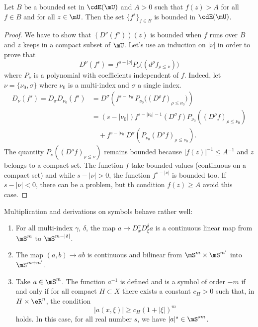 \begin{lemma}   \label{LemHIUsKABh}
Let $B$ be a bounded set in $\cdE(\mU)$ and $A>0$ such that $f(z)>A$ for all $f\in B$ and for all $z\in\mU$. Then the set $\{f^s\}_{f\in B}$ is bounded in $\cdE(\mU)$.
\end{lemma}

\begin{proof}
We have to show that $(D^{\nu}(f^s))(z)$ is bounded when $f$ runs over $B$ and $z$ keeps in a compact subset of $\mU$. Let's use an induction on $|\nu|$ in order to prove that
\[
   D^{\nu}(f^s)=f^{s-|\nu|}P_{\nu}\big(  (d^{\rho}f_{\rho\leq\nu})   \big)
\]
where $P_{\nu}$ is a polynomial with coefficients independent of $f$. Indeed, let $\nu=\{\nu_0,\sigma\}$ where $\nu_0$ is a multi-index and $\sigma$ a single index.
\begin{equation}
\begin{split}
  D_{\nu}(f^s)=D_{\sigma}D_{\nu_0}(f^s)&=D^{\sigma}\left( f^{s-|\nu_0|}P_{\nu_0}\big( (D^{\rho}f)_{\rho\leq\nu_0} \big) \right)\\
              &=(s-|\nu_0|)f^{s-|\nu_0|-1}(D^{\sigma}f)P_{\nu_0}\left( (D^{\rho}f)_{\rho\leq\nu_0} \right)\\
              &\quad    +f^{s-|\nu_0|}D^{\sigma}\left( P_{\nu_0}(D^{\rho}f)_{\rho\leq\nu_0} \right).
\end{split}
\end{equation}
The quantity $P_{\nu}\left( (D^{\rho}f)_{\rho\leq\nu} \right)$ remains bounded because $|f(z)|^{-1}\leq A^{-1}$ and $z$ belongs to a compact set. The function $f$ take bounded values (continuous on a compact set) and while $s-|\nu|>0$, the function $f^{s-|\nu|}$ is bounded too. If $s-|\nu|<0$, there can be a problem, but th condition $f(z)\geq A$ avoid this case.
\end{proof}

\begin{theorem} \label{tho:lenumf}
Multiplication and derivations on symbols behave rather well:
\begin{enumerate}
 \item \label{enufi}  For all multi-index $\gamma$, $\delta$, the map $a\to D^{\gamma}_xD^{\delta}_{\xi}a$ is a continuous linear map from $\mS^m$ to $\mS^{m-|\delta|}$.
 \item \label{enufii} The map  $(a,b)\to ab$ is continuous and bilinear from $\mS^{m}\times\mS^{m'}$ into $\mS^{m+m'}$.
 \item \label{enufiii} Take $a\in\mS^m$. The function $a^{-1}$ is defined and is a symbol of order $-m$ if and only if for all compact $H\subset X$ there exists a constant $c_H>0$ such that, in $H\times\eR^n$, the condition
\[ 
|a(x,\xi)|\geq c_H(1+|\xi|)^m
\]
holds. In this case, for all real number $s$, we have $|a|^s\in\mS^{sm}$.
\end{enumerate}
\end{theorem}

